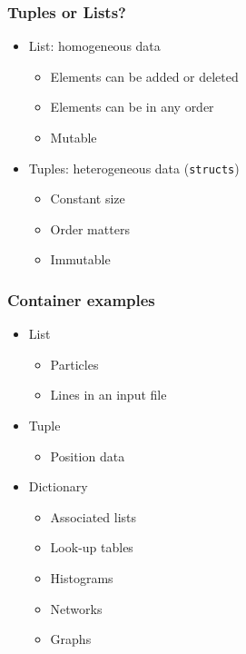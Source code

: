 \documentclass[xcolor=table,10pt,final]{beamer}
\begin{document}
\begin{frame}[fragile]
  \frametitle{Tuples or Lists?}
  \begin{itemize}
    \item List: homogeneous data
      \begin{itemize}
        \item Elements can be added or deleted
        \item Elements can be in any order
        \item Mutable
      \end{itemize}
      \vskip1cm
    \item Tuples: heterogeneous data ({\tt structs})
      \begin{itemize}
        \item Constant size
        \item Order matters
        \item Immutable
      \end{itemize}
  \end{itemize}
\end{frame}


\begin{frame}
  \frametitle{Container examples}
  \begin{itemize}
    \item List
      \begin{itemize}
        \item Particles
        \item Lines in an input file
      \end{itemize}
    \item Tuple
      \begin{itemize}
        \item Position data
      \end{itemize}
    \item Dictionary
      \begin{itemize}
        \item Associated lists
        \item Look-up tables
        \item Histograms
        \item Networks
        \item Graphs
      \end{itemize}
  \end{itemize}
\end{frame}
\end{document}
